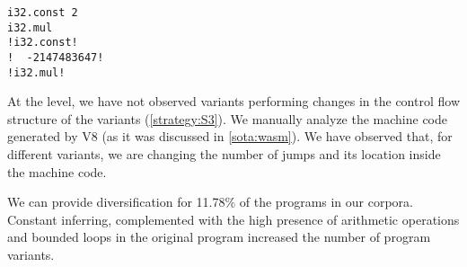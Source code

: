{\begin{code}
\begin{minipage}[b]{0.32\linewidth}
\begin{minipage}[t]{0.46\linewidth}
            \begin{lstlisting}
i32.const 2
i32.mul
!i32.const!
!  -2147483647!
!i32.mul!
            \end{lstlisting}
        \end{minipage}
    \end{minipage}
    \end{code}
}

At the \wasm level, we have not observed variants performing changes in the control flow structure of the variants (\autoref{strategy:S3}). We manually analyze the machine code generated by V8 (as it was discussed in \autoref{sota:wasm}). We have observed that, for different variants, we are changing the number of jumps and its location inside the machine code. 

\begin{tcolorbox}[title=Answer to RQ1.,boxrule=2pt,arc=.3em,boxsep=1.5mm]
    We can provide diversification for 11.78\% of the programs in our corpora. Constant inferring, complemented with the high presence of arithmetic operations and bounded loops in the original program increased the number of program variants. 
\end{tcolorbox}



